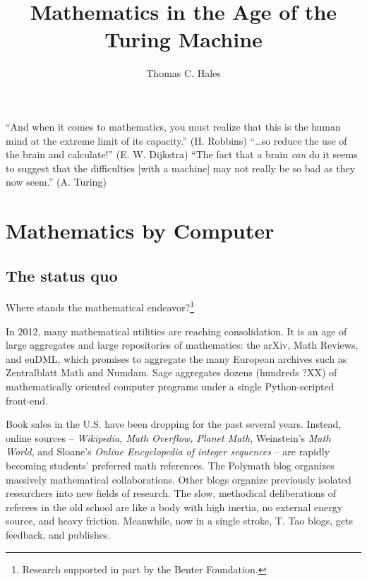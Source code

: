 \documentclass{llncs}
\begin{document}
\title{Mathematics in the Age of the Turing Machine}
\author{Thomas C. Hales}
\maketitle


\section*{}

{

\narrower

\it

``And when it comes to mathematics, you must realize that this is the human mind
at the extreme limit of its capacity.'' (H. Robbins) 
\hfill\break\noindent
``\ldots so reduce the use of
the brain and calculate!'' (E. W. Dijkstra)  
\hfill\break\noindent
``The fact that a brain {\it can} do it seems to suggest that the
difficulties [with a machine] may not really be so bad as they now
seem.''  (A. Turing)

}


\section{Mathematics by Computer}

\subsection{The status quo}

Where stands the mathematical endeavor?\footnote{Research supported in part by the Benter Foundation.}

In 2012, many mathematical utilities are reaching consolidation.  It
is an age of large aggregates and large repositories of mathematics:
the arXiv, Math Reviews, and euDML, which promises to aggregate the
many European archives such as Zentralblatt Math and Numdam.  Sage
aggregates dozens (hundreds ?XX) of mathematically oriented computer
programs under a single Python-scripted front-end.


Book sales in the U.S. have been dropping  for the past several years. 
Instead, online sources -- {\it Wikipedia, Math Overflow, Planet
  Math}, Weinstein's {\it Math World}, and Sloane's {\it Online
  Encyclopedia of integer sequences} -- are rapidly becoming students'
preferred math references. The Polymath blog organizes massively
mathematical collaborations.  Other blogs organize previously isolated
researchers into new fields of research.  The slow, methodical
deliberations of referees in the old school are like a body with high
inertia, no external energy source, and heavy friction.  Meanwhile,
now in a single stroke, T. Tao blogs, gets feedback, and publishes.
\end{document}
